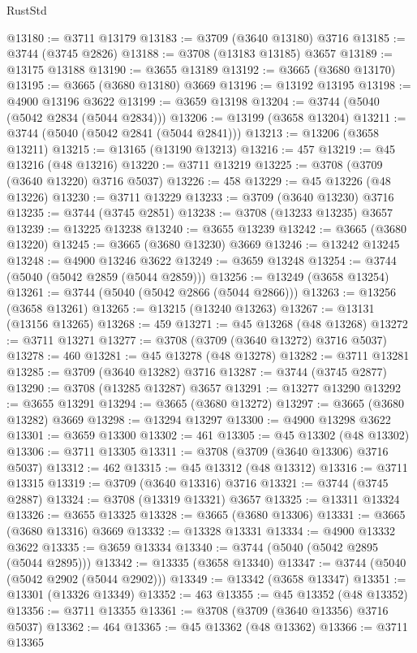 \begin{lexlean}{RustStd}
\begin{coremodule}
@13180 := @3711 @13179
@13183 := @3709 (@3640 @13180) @3716
@13185 := @3744 (@3745 @2826)
@13188 := @3708 (@13183 @13185) @3657
@13189 := @13175 @13188
@13190 := @3655 @13189
@13192 := @3665 (@3680 @13170)
@13195 := @3665 (@3680 @13180) @3669
@13196 := @13192 @13195
@13198 := @4900 @13196 @3622
@13199 := @3659 @13198
@13204 := @3744 (@5040 (@5042 @2834 (@5044 @2834)))
@13206 := @13199 (@3658 @13204)
@13211 := @3744 (@5040 (@5042 @2841 (@5044 @2841)))
@13213 := @13206 (@3658 @13211)
@13215 := @13165 (@13190 @13213)
@13216 := 457
@13219 := @45 @13216 (@48 @13216)
@13220 := @3711 @13219
@13225 := @3708 (@3709 (@3640 @13220) @3716 @5037)
@13226 := 458
@13229 := @45 @13226 (@48 @13226)
@13230 := @3711 @13229
@13233 := @3709 (@3640 @13230) @3716
@13235 := @3744 (@3745 @2851)
@13238 := @3708 (@13233 @13235) @3657
@13239 := @13225 @13238
@13240 := @3655 @13239
@13242 := @3665 (@3680 @13220)
@13245 := @3665 (@3680 @13230) @3669
@13246 := @13242 @13245
@13248 := @4900 @13246 @3622
@13249 := @3659 @13248
@13254 := @3744 (@5040 (@5042 @2859 (@5044 @2859)))
@13256 := @13249 (@3658 @13254)
@13261 := @3744 (@5040 (@5042 @2866 (@5044 @2866)))
@13263 := @13256 (@3658 @13261)
@13265 := @13215 (@13240 @13263)
@13267 := @13131 (@13156 @13265)
@13268 := 459
@13271 := @45 @13268 (@48 @13268)
@13272 := @3711 @13271
@13277 := @3708 (@3709 (@3640 @13272) @3716 @5037)
@13278 := 460
@13281 := @45 @13278 (@48 @13278)
@13282 := @3711 @13281
@13285 := @3709 (@3640 @13282) @3716
@13287 := @3744 (@3745 @2877)
@13290 := @3708 (@13285 @13287) @3657
@13291 := @13277 @13290
@13292 := @3655 @13291
@13294 := @3665 (@3680 @13272)
@13297 := @3665 (@3680 @13282) @3669
@13298 := @13294 @13297
@13300 := @4900 @13298 @3622
@13301 := @3659 @13300
@13302 := 461
@13305 := @45 @13302 (@48 @13302)
@13306 := @3711 @13305
@13311 := @3708 (@3709 (@3640 @13306) @3716 @5037)
@13312 := 462
@13315 := @45 @13312 (@48 @13312)
@13316 := @3711 @13315
@13319 := @3709 (@3640 @13316) @3716
@13321 := @3744 (@3745 @2887)
@13324 := @3708 (@13319 @13321) @3657
@13325 := @13311 @13324
@13326 := @3655 @13325
@13328 := @3665 (@3680 @13306)
@13331 := @3665 (@3680 @13316) @3669
@13332 := @13328 @13331
@13334 := @4900 @13332 @3622
@13335 := @3659 @13334
@13340 := @3744 (@5040 (@5042 @2895 (@5044 @2895)))
@13342 := @13335 (@3658 @13340)
@13347 := @3744 (@5040 (@5042 @2902 (@5044 @2902)))
@13349 := @13342 (@3658 @13347)
@13351 := @13301 (@13326 @13349)
@13352 := 463
@13355 := @45 @13352 (@48 @13352)
@13356 := @3711 @13355
@13361 := @3708 (@3709 (@3640 @13356) @3716 @5037)
@13362 := 464
@13365 := @45 @13362 (@48 @13362)
@13366 := @3711 @13365

\end{coremodule}
\end{lexlean}
